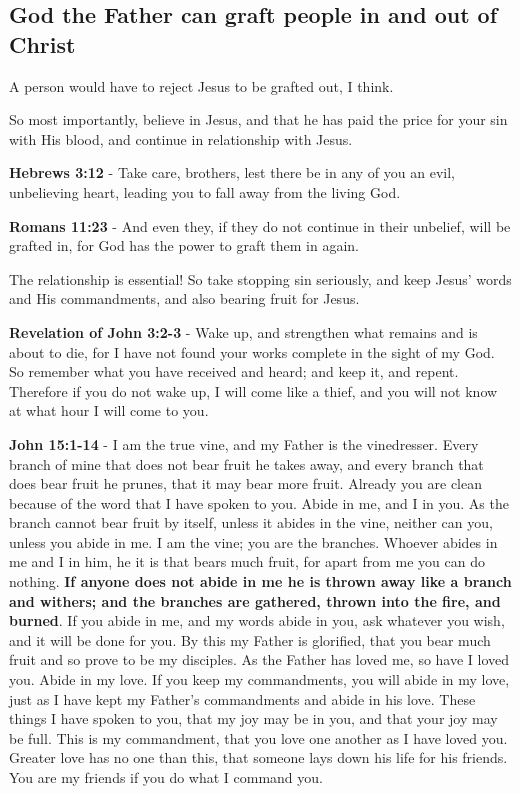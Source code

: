 \documentclass[11pt]{article}
\begin{document}
\subsection{God the Father can graft people in and out of Christ}
\label{sec:org85c3484}
A person would have to reject Jesus to be grafted out, I think.

So most importantly, believe in Jesus, and that he has paid the price for your sin with His blood, and continue in relationship with Jesus.

\textbf{Hebrews 3:12} - Take care, brothers, lest there be in any of you an evil, unbelieving heart, leading you to fall away from the living God.

\textbf{Romans 11:23} - And even they, if they do not continue in their unbelief, will be grafted in, for God has the power to graft them in again.

The relationship is essential!
So take stopping sin seriously, and keep Jesus' words and His commandments, and also bearing fruit for Jesus.

\textbf{Revelation of John 3:2-3} - Wake up, and strengthen what remains and is about to die, for I have not found your works complete in the sight of my God. So remember what you have received and heard; and keep it, and repent. Therefore if you do not wake up, I will come like a thief, and you will not know at what hour I will come to you.

\textbf{John 15:1-14} - I am the true vine, and my Father is the vinedresser. Every branch of mine that does not bear fruit he takes away, and every branch that does bear fruit he prunes, that it may bear more fruit. Already you are clean because of the word that I have spoken to you. Abide in me, and I in you. As the branch cannot bear fruit by itself, unless it abides in the vine, neither can you, unless you abide in me. I am the vine; you are the branches. Whoever abides in me and I in him, he it is that bears much fruit, for apart from me you can do nothing. \textbf{If anyone does not abide in me he is thrown away like a branch and withers; and the branches are gathered, thrown into the fire, and burned}. If you abide in me, and my words abide in you, ask whatever you wish, and it will be done for you. By this my Father is glorified, that you bear much fruit and so prove to be my disciples. As the Father has loved me, so have I loved you. Abide in my love. If you keep my commandments, you will abide in my love, just as I have kept my Father's commandments and abide in his love. These things I have spoken to you, that my joy may be in you, and that your joy may be full. This is my commandment, that you love one another as I have loved you. Greater love has no one than this, that someone lays down his life for his friends. You are my friends if you do what I command you.
\end{document}
